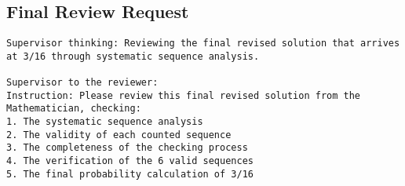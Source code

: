 \subsection{Final Review Request}
\vspace{-0.5em}
\begin{supervisorbox}
\begin{lstlisting}
Supervisor thinking: Reviewing the final revised solution that arrives at 3/16 through systematic sequence analysis.

Supervisor to the reviewer:
Instruction: Please review this final revised solution from the Mathematician, checking:
1. The systematic sequence analysis
2. The validity of each counted sequence
3. The completeness of the checking process
4. The verification of the 6 valid sequences
5. The final probability calculation of 3/16

\end{lstlisting}
\end{supervisorbox}

